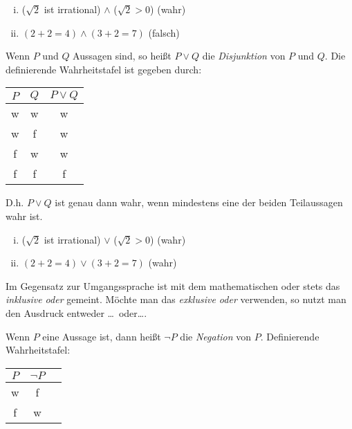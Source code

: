\begin{example}
    \begin{enumerate}[(i)]
        \item
        ($\sqrt{2}$ ist irrational) $\wedge$ ($\sqrt{2} > 0$) (wahr)
        \item
        $(2 + 2 = 4) \wedge (3 + 2 = 7)$ (falsch)
    \end{enumerate}
\end{example}

\begin{mydef}
Wenn $P$ und $Q$ Aussagen sind, so heißt $P \vee Q$ die \textit{Disjunktion}
von $P$ und $Q$.
Die definierende Wahrheitstafel ist gegeben durch:

    \begin{tabular}{ c | c | c }
        $P$ & $Q$ & $P \vee Q$ \\
        \hline
        w & w & w \\
        w & f & w \\
        f & w & w \\
        f & f & f \\
    \end{tabular}
    \newline
D.h. $P \vee Q$ ist genau dann wahr, wenn mindestens eine der beiden
Teilaussagen wahr ist.
\end{mydef}

\begin{example}
    \begin{enumerate}[(i)]
        \item
        ($\sqrt{2}$ ist irrational) $\vee$ ($\sqrt{2} > 0$) (wahr)
        \item
        $(2 + 2 = 4) \vee (3 + 2 = 7)$ (wahr)
    \end{enumerate}
\end{example}

\begin{remark}
Im Gegensatz zur Umgangssprache ist mit dem mathematischen oder stets das
\textit{inklusive oder} gemeint.
Möchte man das \textit{exklusive oder} verwenden, so nutzt man den Ausdruck
\glqq entweder \ldots\ oder\ldots\grqq.
\end{remark}

\begin{mydef}
Wenn $P$ eine Aussage ist, dann heißt $\neg P$ die \textit{Negation} von $P$.
Definierende Wahrheitstafel:

    \begin{tabular}{ c | c | c }
        $P$ &  $\neg P$ \\
        \hline
        w & f  \\
        f & w  \\
    \end{tabular}
\end{mydef}


